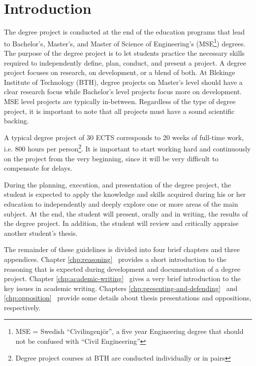 \documentclass[a4paper,12pt]{book}
\begin{document}
\mainmatter


\chapter{Introduction}
\label{chp:intro}
The degree project is conducted at the end of the education programs that
lead to Bachelor's, Master's, and Master of Science of Engineering's
(MSE\footnote{MSE = Swedish ``Civilingenjör'', a five year Engineering
degree that should not be confused with ``Civil Engineering''}) degrees.
The purpose of the degree project is to let students practice the necessary skills required
to independently define, plan, conduct, and present a project.
A degree project
focuses on research, on development, or a blend of both. At Blekinge
Institute of Technology (BTH), degree projects on Master's level should have a clear
research focus while Bachelor's level projects focus more on development. MSE level projects are typically in-between. Regardless of the type of degree project, it is important
to note that all projects must have a sound scientific backing.

A typical degree project of 30 ECTS corresponds to 20 weeks of full-time work,
i.e. 800 hours per person\footnote{Degree project courses at BTH are conducted individually or in pairs}.
It is important to start working hard and continuously on the project
from the very beginning, since it will be very difficult to compensate for
delays.

During the planning, execution, and presentation of the degree project,
the student is expected to
apply the knowledge and skills acquired during his or her education to independently
and deeply explore one or more areas of the main subject.
At the end, the student will present, orally and in writing, the results of
the degree project. In addition, the student will review and critically
appraise another student's thesis.

The remainder of these guidelines is divided into four brief chapters and three appendices.
Chapter \ref{chp:reasoning}~\emph{}
provides a short introduction to the reasoning that
is expected during development and documentation of a degree project.
Chapter \ref{chp:academic-writing}~\emph{}
gives a very brief introduction to the key issues in academic writing.
Chapters \ref{chp:presenting-and-defending}~\emph{} and \ref{chp:opposition}~\emph{}
provide some details about thesis presentations and oppositions, respectively.
\end{document}
